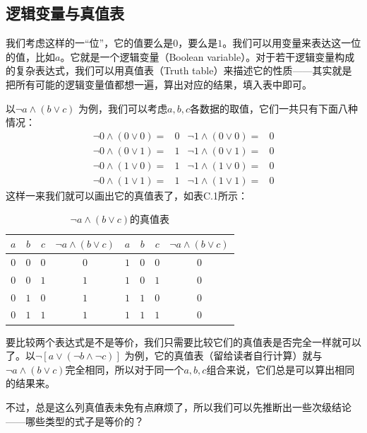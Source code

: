 \subsection*{逻辑变量与真值表}
我们考虑这样的一``位''，它的值要么是$0$，要么是$1$。我们可以用变量来表达这一位的值，比如$a$。它就是一个逻辑变量（Boolean variable）。对于若干逻辑变量构成的复杂表达式，我们可以用真值表（Truth table）来描述它的性质——其实就是把所有可能的逻辑变量值都想一遍，算出对应的结果，填入表中即可。\par
以$\lnot a\land(b\lor c)$ 为例，我们可以考虑$a, b, c$各数据的取值，它们一共只有下面八种情况：
\begin{align*}
\lnot0\land(0\lor0)={}&0{}&\lnot1\land(0\lor0)={}&0\\
\lnot0\land(0\lor1)={}&1{}&\lnot1\land(0\lor1)={}&0\\
\lnot0\land(1\lor0)={}&1{}&\lnot1\land(1\lor0)={}&0\\
\lnot0\land(1\lor1)={}&1{}&\lnot1\land(1\lor1)={}&0
\end{align*}
这样一来我们就可以画出它的真值表了，如表C.1所示：
\begin{table}[htbp]
\centering
\begin{tabular}{cccc|cccc}
\hline\rule{0pt}{2.4ex}
$a$ & $b$ & $c$ & $\lnot a\land(b\lor c)$ & $a$ & $b$ & $c$ & $\lnot a\land(b\lor c)$\\
\hline\hline\rule{0pt}{2.4ex}
$0$ & $0$ & $0$ & $0$ & $1$ & $0$ & $0$ & $0$\\
\hline\rule{0pt}{2.4ex}
$0$ & $0$ & $1$ & $1$ & $1$ & $0$ & $1$ & $0$\\
\hline\rule{0pt}{2.4ex}
$0$ & $1$ & $0$ & $1$ & $1$ & $1$ & $0$ & $0$\\
\hline\rule{0pt}{2.4ex}
$0$ & $1$ & $1$ & $1$ & $1$ & $1$ & $1$ & $0$\\
\hline
\end{tabular}
\caption{$\lnot a\land(b\lor c)$的真值表}
\end{table}\par
要比较两个表达式是不是等价，我们只需要比较它们的真值表是否完全一样就可以了。以\newline$\lnot[a\lor(\lnot b\land\lnot c)]$ 为例，它的真值表（留给读者自行计算）就与$\lnot a\land(b\lor c)$完全相同，所以对于同一个$a, b, c$组合来说，它们总是可以算出相同的结果来。\par
不过，总是这么列真值表未免有点麻烦了，所以我们可以先推断出一些次级结论——哪些类型的式子是等价的？\par
